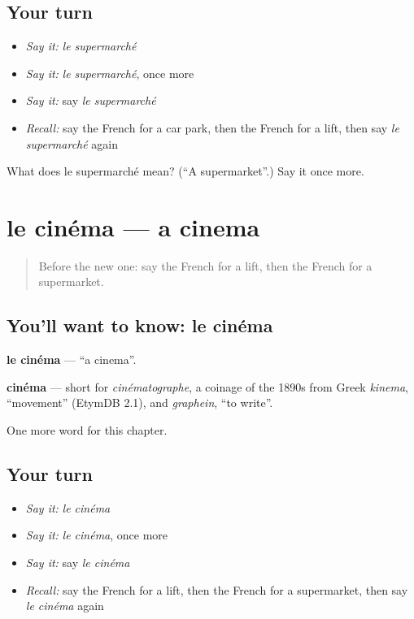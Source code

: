 \subsection*{Your turn}
\begin{itemize}
\raggedright
  \item \emph{Say it:} \emph{le supermarché}
  \item \emph{Say it:} \emph{le supermarché}, once more
  \item \emph{Say it:} say \emph{le supermarché}
  \item \emph{Recall:} say the French for a car park, then the French for a lift, then say \emph{le supermarché} again
\end{itemize}

\begin{tcolorbox}[breakable,colback=teal!4,colframe=teal!35!black,title={Before you move on}]
What does le supermarché mean? (\textquotedblleft{}A supermarket\textquotedblright{}.) Say it once more.
\end{tcolorbox}
\section[le cinéma]{le cinéma — a cinema}

\label{lesson:FR-C107-cinema}



\begin{quote}
Before the new one: say the French for a lift, then the French for a supermarket.
\end{quote}

\subsection*{You'll want to know: le cinéma}
\textbf{le cinéma} — \textquotedblleft{}a cinema\textquotedblright{}.

\begin{cousinweb}
\textbf{cinéma} — short for \emph{cinématographe}, a coinage of the 1890s from Greek \emph{kinema}, \textquotedblleft{}movement\textquotedblright{} (EtymDB 2.1), and \emph{graphein}, \textquotedblleft{}to write\textquotedblright{}.
\end{cousinweb}

\begin{grammarlens}[title={What you've built}]
One more word for this chapter.
\end{grammarlens}

\subsection*{Your turn}
\begin{itemize}
\raggedright
  \item \emph{Say it:} \emph{le cinéma}
  \item \emph{Say it:} \emph{le cinéma}, once more
  \item \emph{Say it:} say \emph{le cinéma}
  \item \emph{Recall:} say the French for a lift, then the French for a supermarket, then say \emph{le cinéma} again
\end{itemize}

